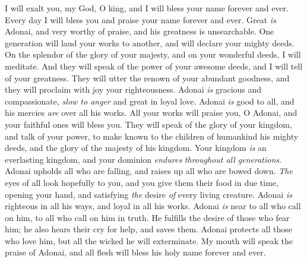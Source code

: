 \begin{biblechapter} %
 I will exalt you, my God, O king, 
and I will bless your name forever and ever.
\verse Every day I will bless you 
and praise your name forever and ever.
\verse Great \textit{is} Adonai, and very worthy of praise, 
and his greatness is unsearchable.
\verse One generation will laud your works to another, 
and will declare your mighty deeds.
\verse On the splendor of the glory of your majesty, 
and on your wonderful deeds, I will meditate.
\verse And they will speak of the power of your awesome deeds, 
and I will tell of your greatness.
\verse They will utter  the renown of your abundant goodness, 
and they will proclaim with joy your righteousness.
\verse Adonai \textit{is} gracious and compassionate, 
\textit{slow to anger} and great in loyal love.
\verse Adonai \textit{is} good to all, 
and his mercies \textit{are} over all his works.
\verse All your works will praise you, O Adonai, 
and your faithful ones will bless you.
\verse They will speak of the glory of your kingdom, 
and talk of your power,
\verse to make known to the children of humankind his mighty deeds, 
and the glory of the majesty of his kingdom.
\verse Your kingdom \textit{is} an everlasting kingdom, 
and your dominion \textit{endures} \textit{throughout all generations}.
\verse Adonai upholds all who are falling, 
and raises up all who are bowed down.
\verse \textit{The} eyes of all look hopefully to you, 
and you give them their food in due time,
\verse opening your hand, 
and satisfying \textit{the} desire \textit{of} every living creature.
\verse Adonai \textit{is} righteous in all his ways, 
and loyal in all his works.
\verse Adonai \textit{is} near to all who call on him, 
to all who call on him in truth.
\verse He fulfills the desire of those who fear him; 
he also hears their cry for help, and saves them.
\verse Adonai protects all those who love him, 
but all the wicked he will exterminate.
\verse My mouth will speak the praise of Adonai, 
and all flesh will bless his holy name 
forever and ever.
\end{biblechapter}

